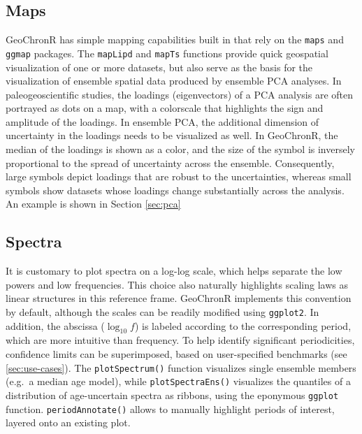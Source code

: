 \documentclass[gchron, manuscript]{copernicus}
\begin{document}
\subsection{Maps}

GeoChronR has simple mapping capabilities built in that rely on the \texttt{maps} \citep{maps} and \texttt{ggmap} \citep{ggmap} packages.
The \texttt{mapLipd} and \texttt{mapTs} functions provide quick geospatial visualization of one or more datasets, but also serve as the basis for the visualization of ensemble spatial data produced by ensemble PCA analyses.
In paleogeoscientific studies, the loadings (eigenvectors) of a PCA analysis are often portrayed as dots on a map, with a colorscale that highlights the sign and amplitude of the loadings.
In ensemble PCA, the additional dimension of uncertainty in the loadings needs to be visualized as well.
In GeoChronR, the median of the loadings is shown as a color, and the size of the symbol is inversely proportional to the spread of uncertainty across the ensemble.
Consequently, large symbols depict loadings that are robust to the uncertainties, whereas small symbols show datasets whose loadings change substantially across the analysis.
An example is shown in Section \ref{sec:pca}

\hypertarget{sec:spec_viz}{%
\subsection{Spectra}\label{sec:spec_viz}}

It is customary to plot spectra on a log-log scale, which helps separate the low powers and low frequencies.
This choice also naturally highlights scaling laws \citep[\citet{ZhuPNAS2019}]{lovejoy2013weather} as linear structures in this reference frame.
GeoChronR implements this convention by default, although the scales can be readily modified using \texttt{ggplot2}.
In addition, the abscissa (\(\log_{10} f\)) is labeled according to the corresponding period, which are more intuitive than frequency.
To help identify significant periodicities, confidence limits can be superimposed, based on user-specified benchmarks (see \ref{sec:use-cases}).
The \texttt{plotSpectrum()} function visualizes single ensemble members (e.g.~a median age model), while \texttt{plotSpectraEns()} visualizes the quantiles of a distribution of age-uncertain spectra as ribbons, using the eponymous \texttt{ggplot} function.
\texttt{periodAnnotate()} allows to manually highlight periods of interest, layered onto an existing plot.
\end{document}
